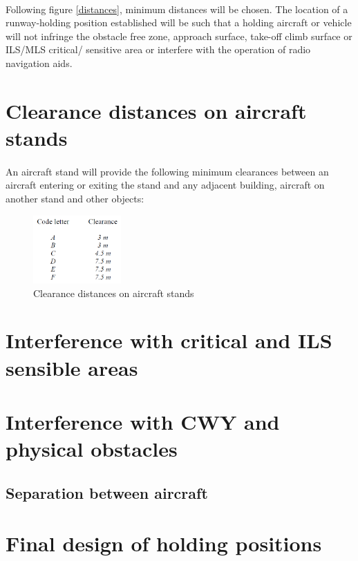 	\paragraph{} Following figure \ref{distances}, minimum distances will be chosen. The location of a runway-holding position established will be such that a holding aircraft or vehicle will not infringe the obstacle free zone, approach surface, take-off climb surface or ILS/MLS critical/ sensitive area or interfere with the operation of radio navigation aids.
	
	\section{Clearance distances on aircraft stands}
	\paragraph{} An aircraft stand will provide the following minimum clearances between an aircraft entering or exiting the stand and any adjacent building, aircraft on another stand and other objects:
	
	\begin{figure}[H]
		\centering
		\includegraphics[clip, trim=0cm 0cm 0cm 0cm, width=0.3\textwidth]{./images/holding/clearances}
		\caption{Clearance distances on aircraft stands}
		\label{clearances}
	\end{figure}
	
	\section{Interference with critical and ILS sensible areas}
	
	\section{Interference with CWY and physical obstacles}
	
	\subsection{Separation between aircraft }
	
	\section{Final design of holding positions}